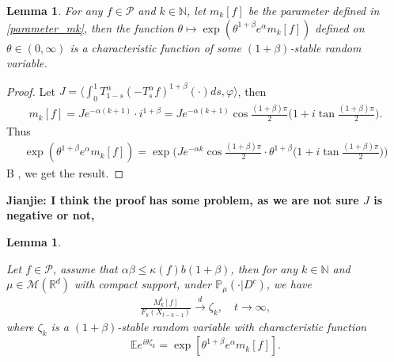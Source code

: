 \documentclass[12pt,oneside,english]{amsart}
\theoremstyle{plain}
\newtheorem{lem}[thm]{Lemma}
\theoremstyle{definition}
\numberwithin{equation}{section}
\begin{document}
\begin{lem}
For any $f\in \mathcal{P}$ and $k\in \mathbb{N}$, let $m_k[f]$ be the parameter defined in \eqref{parameter_mk}, then the function $\theta\mapsto \exp(\theta^{1+\beta}e^{\alpha}m_k[f])$ defined on $\theta\in(0,\infty)$ is a characteristic function of some $(1+\beta)$-stable random variable.
\end{lem}
\begin{proof}
    Let $J=\langle\int_0^1 T_{1-s}^{\alpha}(-T^{\alpha}_s f)^{1+\beta}(\cdot)ds,\varphi\rangle$, then 
    \begin{align}
        m_k[f]=J e^{-\alpha(k+1)}\cdot i^{1+\beta}=J e^{-\alpha(k+1)}\cos\frac{(1+\beta)\pi}{2}\big(1+i\tan\frac{(1+\beta)\pi}{2}\big).
    \end{align}
Thus
\begin{align}
    \exp(\theta^{1+\beta}e^{\alpha}m_k[f])=\exp\big(J e^{-\alpha k}\cos\frac{(1+\beta)\pi}{2}\cdot\theta^{1+\beta}\big(1+i\tan\frac{(1+\beta)\pi}{2}\big)\big)
\end{align}
B \cite[Theorem 14.15]{Sato1990Levy}, we get the result.
\end{proof}
{\bf Jianjie: I think the proof has some problem, as we are not sure $J$ is negative or not,}
\begin{lem}\label{lemma33}

 Let $f\in \mathcal{P}$, assume that $\alpha\beta\leq \kappa(f)b(1+\beta)$, then for any  $k\in\mathbb{N}$ and $\mu \in \mathcal{M}(\mathbb{R}^d)$ with compact support, under $\mathbb{P}_{\mu}(\cdot | D ^c)$, we have
 \begin{align}
      \frac{M_k^t[f]}{F_k(X_{t-k-1})}\xrightarrow{d}\zeta_k, \quad t\rightarrow \infty, \label{limitdistribution1}
 \end{align}
 where $\zeta_k$ is a $(1+\beta)$-stable random variable with characteristic function
 $$\mathbb{E}e^{i\theta\zeta_k}=\exp\left[\theta^{1+\beta}e^{\alpha}m_k[f]\right].$$
 \end{lem}
\end{document}

